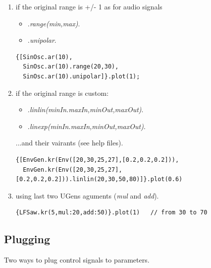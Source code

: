 \begin{enumerate}
\def\labelenumi{\arabic{enumi}.}
\tightlist
\item if the original range is +/- 1 as for audio signals
    \begin{itemize}
    \tightlist
    \item \textit{.range(min,max)}.
    \item \textit{.unipolar}.
    \end{itemize}
\begin{lstlisting}[frame=single] 
{[SinOsc.ar(10),
  SinOsc.ar(10).range(20,30),
  SinOsc.ar(10).unipolar]}.plot(1);
\end{lstlisting}

\item if the original range is custom:
    \begin{itemize}
    \tightlist
    \item \textit{.linlin(minIn.maxIn,minOut,maxOut)}.
    \item \textit{.linexp(minIn.maxIn,minOut,maxOut)}.
    \end{itemize}
   ...and their vairants (see help files).
\begin{lstlisting}[frame=single] 
{[EnvGen.kr(Env([20,30,25,27],[0.2,0.2,0.2])),
  EnvGen.kr(Env([20,30,25,27],[0.2,0.2,0.2])).linlin(20,30,50,80)]}.plot(0.6)
\end{lstlisting}

\item using last two UGens aguments (\textit{mul} and \textit{add}).
\begin{lstlisting}[frame=single] 
{LFSaw.kr(5,mul:20,add:50)}.plot(1)   // from 30 to 70
\end{lstlisting}
\end{enumerate}

\subsection{Plugging}\label{plugging}

Two ways to plug control signals to parameters.

